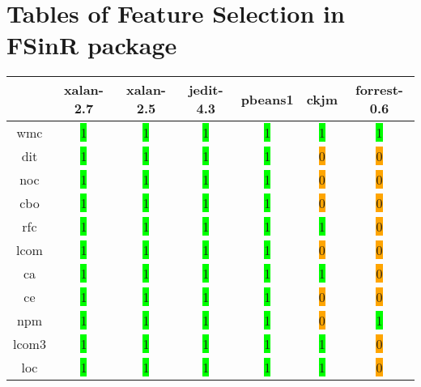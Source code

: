 \chapter{Tables of Feature Selection in FSinR package}
\label{cha:fsinr-fs}

\begin{table}[H]
\centering
    \begin{tabular}{|c|c|c|c|c|c|c|}
        \hline
         & xalan-2.7 & xalan-2.5 & jedit-4.3 & pbeans1 & ckjm & forrest-0.6 \\ \hline
        \acrshort{wmc} & \colorbox{lime}{1} & \colorbox{lime}{1} & \colorbox{lime}{1} & \colorbox{lime}{1} & \colorbox{lime}{1} & \colorbox{lime}{1} \\ \hline
        \acrshort{dit} & \colorbox{lime}{1} & \colorbox{lime}{1} & \colorbox{lime}{1} & \colorbox{lime}{1} & \colorbox{orange}{0} & \colorbox{orange}{0} \\ \hline
        \acrshort{noc} & \colorbox{lime}{1} & \colorbox{lime}{1} & \colorbox{lime}{1} & \colorbox{lime}{1} & \colorbox{orange}{0} & \colorbox{orange}{0} \\ \hline
        \acrshort{cbo} & \colorbox{lime}{1} & \colorbox{lime}{1} & \colorbox{lime}{1} & \colorbox{lime}{1} & \colorbox{orange}{0} & \colorbox{orange}{0} \\ \hline
        \acrshort{rfc} & \colorbox{lime}{1} & \colorbox{lime}{1} & \colorbox{lime}{1} & \colorbox{lime}{1} & \colorbox{lime}{1} & \colorbox{orange}{0} \\ \hline
        \acrshort{lcom} & \colorbox{lime}{1} & \colorbox{lime}{1} & \colorbox{lime}{1} & \colorbox{lime}{1} & \colorbox{orange}{0} & \colorbox{orange}{0} \\ \hline
        \acrshort{ca} & \colorbox{lime}{1} & \colorbox{lime}{1} & \colorbox{lime}{1} & \colorbox{lime}{1} & \colorbox{lime}{1} & \colorbox{orange}{0} \\ \hline
        \acrshort{ce} & \colorbox{lime}{1} & \colorbox{lime}{1} & \colorbox{lime}{1} & \colorbox{lime}{1} & \colorbox{orange}{0} & \colorbox{orange}{0} \\ \hline
        \acrshort{npm} & \colorbox{lime}{1} & \colorbox{lime}{1} & \colorbox{lime}{1} & \colorbox{lime}{1} & \colorbox{orange}{0} & \colorbox{lime}{1} \\ \hline
        \acrshort{lcom3} & \colorbox{lime}{1} & \colorbox{lime}{1} & \colorbox{lime}{1} & \colorbox{lime}{1} & \colorbox{lime}{1} & \colorbox{orange}{0} \\ \hline
        \acrshort{loc} & \colorbox{lime}{1} & \colorbox{lime}{1} & \colorbox{lime}{1} & \colorbox{lime}{1} & \colorbox{lime}{1} & \colorbox{orange}{0} \\ \hline

\end{tabular}
\end{table}
